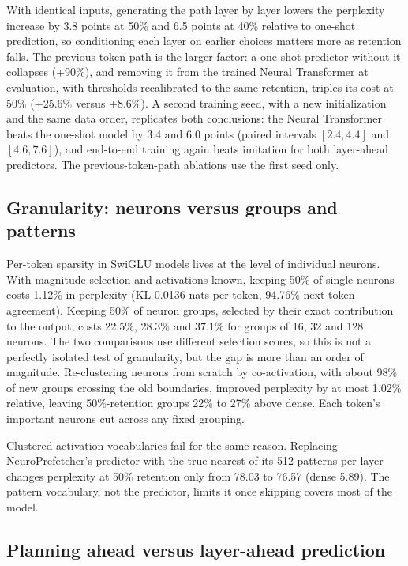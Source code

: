 \documentclass[10pt,twocolumn,letterpaper]{article}
\begin{document}
With identical inputs, generating the path layer by layer lowers the perplexity increase by 3.8 points at 50\% and 6.5 points at 40\% relative to one-shot prediction, so conditioning each layer on earlier choices matters more as retention falls. The previous-token path is the larger factor: a one-shot predictor without it collapses (+90\%), and removing it from the trained Neural Transformer at evaluation, with thresholds recalibrated to the same retention, triples its cost at 50\% (+25.6\% versus +8.6\%). A second training seed, with a new initialization and the same data order, replicates both conclusions: the Neural Transformer beats the one-shot model by 3.4 and 6.0 points (paired intervals $[2.4, 4.4]$ and $[4.6, 7.6]$), and end-to-end training again beats imitation for both layer-ahead predictors. The previous-token-path ablations use the first seed only.

\subsection{Granularity: neurons versus groups and patterns}

Per-token sparsity in SwiGLU models lives at the level of individual neurons. With magnitude selection and activations known, keeping 50\% of single neurons costs 1.12\% in perplexity (KL 0.0136 nats per token, 94.76\% next-token agreement). Keeping 50\% of neuron groups, selected by their exact contribution to the output, costs 22.5\%, 28.3\% and 37.1\% for groups of 16, 32 and 128 neurons. The two comparisons use different selection scores, so this is not a perfectly isolated test of granularity, but the gap is more than an order of magnitude. Re-clustering neurons from scratch by co-activation, with about 98\% of new groups crossing the old boundaries, improved perplexity by at most 1.02\% relative, leaving 50\%-retention groups 22\% to 27\% above dense. Each token's important neurons cut across any fixed grouping.

Clustered activation vocabularies fail for the same reason. Replacing NeuroPrefetcher's predictor with the true nearest of its 512 patterns per layer changes perplexity at 50\% retention only from 78.03 to 76.57 (dense 5.89). The pattern vocabulary, not the predictor, limits it once skipping covers most of the model.

\subsection{Planning ahead versus layer-ahead prediction}
\end{document}
